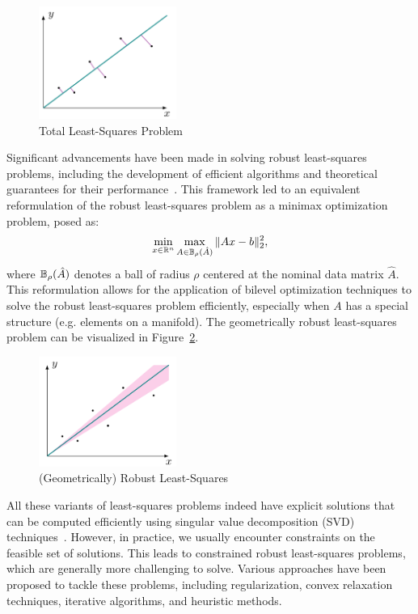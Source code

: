 \begin{figure}[h]
    \centering
    \includegraphics[width=0.4\textwidth]{figures/total-lsq.png}
    \caption{Total Least-Squares Problem}
    \label{fig:total-lsq}
\end{figure}

Significant advancements have been made in solving robust least-squares problems, including the development of efficient algorithms and theoretical guarantees for their performance~\cite{ghaoui97}. This framework led to an equivalent reformulation of the robust least-squares problem as a minimax optimization problem, posed as:
\[\min_{x \in \mathbb{R}^n} \max_{A \in \mathbb{B}_{\rho}(\hat{A})} \|Ax - b\|_2^2,\]
where \(\mathbb{B}_{\rho}(\hat{A})\) denotes a ball of radius \(\rho\) centered at the nominal data matrix \(\hat{A}\). This reformulation allows for the application of bilevel optimization techniques to solve the robust least-squares problem efficiently, especially when $A$ has a special structure (e.g. elements on a manifold). The geometrically robust least-squares problem can be visualized in Figure~\ref{fig:robust-lsq}.

\begin{figure}[h]
    \centering
    \includegraphics[width=0.4\textwidth]{figures/robust-lsq.png}
    \caption{(Geometrically) Robust Least-Squares}
    \label{fig:robust-lsq}
\end{figure}

All these variants of least-squares problems indeed have explicit solutions that can be computed efficiently using singular value decomposition (SVD) techniques~\cite{golub1980}. However, in practice, we usually encounter constraints on the feasible set of solutions. This leads to constrained robust least-squares problems, which are generally more challenging to solve. Various approaches have been proposed to tackle these problems, including regularization, convex relaxation techniques, iterative algorithms, and heuristic methods.

